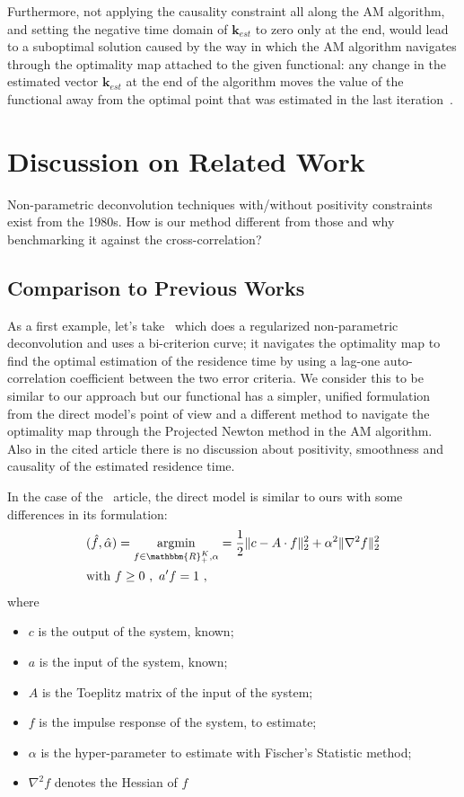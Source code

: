 \documentclass[]{elsarticle} %
\begin{document}
Furthermore, not applying the causality constraint all along the AM algorithm, and  setting the negative time domain of $\textbf{k}_{est}$ to zero only at the end, would lead to a suboptimal solution caused by the way in which the AM algorithm navigates through the optimality map attached to the given functional: any change in the estimated vector $\textbf{k}_{est}$ at the end of the algorithm moves the value of the functional away from the optimal point that was estimated in the last iteration~\cite{McCormick1969, Z_Hydro_bertsekas1982}.

\section{Discussion on Related Work}
\label{sec:discussion}
Non-parametric deconvolution techniques with/without positivity constraints exist from the 1980s. How is our method different from those and why benchmarking it against the cross-correlation?

\subsection{Comparison to Previous Works}

As a first example, let's take~\cite{Z_Hydro_Neuman1982} which does a regularized non-parametric deconvolution and uses a bi-criterion curve; it navigates the optimality map to find the optimal estimation of the residence time by using a lag-one auto-correlation coefficient between the two error criteria. We consider this to be similar to our approach but our functional has a simpler, unified formulation from the direct model's point of view and a different method to navigate the optimality map through the Projected Newton method in the AM algorithm. Also in the cited article there is no discussion about positivity, smoothness and causality of the estimated residence time.

In the case of the~\cite{Skaggs1998} article, the direct model is similar to ours with some differences in its formulation:
\begin{equation}\label{10}
\begin{aligned}
& (\hat{f},  \hat{\alpha}) = \underset{f\in\mathbbm{R}_+^K,\alpha}{\text{argmin}} =  \frac{1}{2} \|c - A \cdot f \|_2^2 + \alpha^{2} \|\nabla^{2} f\|_{2}^{2}  \\
&\text{with } f \geq 0\ ,\  a'f=1\ ,
\end{aligned}
\end{equation}
where
\begin{itemize}
    \item $c$ is the output of the system, known;
    \item $a$ is the input of the system, known;
    \item $A$ is the Toeplitz matrix of the input of the system;
    \item $f$ is the impulse response of the system, to estimate;
    \item $\alpha$ is the hyper-parameter to estimate with Fischer's Statistic method;
    \item $\nabla^{2} f$ denotes the Hessian of $f$
\end{itemize}
\end{document}
